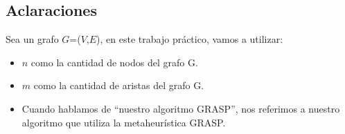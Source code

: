 \subsection{Aclaraciones}

Sea un grafo $G$=($V$,$E$), en este trabajo práctico, vamos a utilizar:
\begin{itemize}
 \item $n$ como la cantidad de nodos del grafo G.
 \item $m$ como la cantidad de aristas del grafo G.
 \item Cuando hablamos de ``nuestro algoritmo GRASP'', nos referimos a nuestro algoritmo que utiliza la metaheurística GRASP.
\end{itemize}
